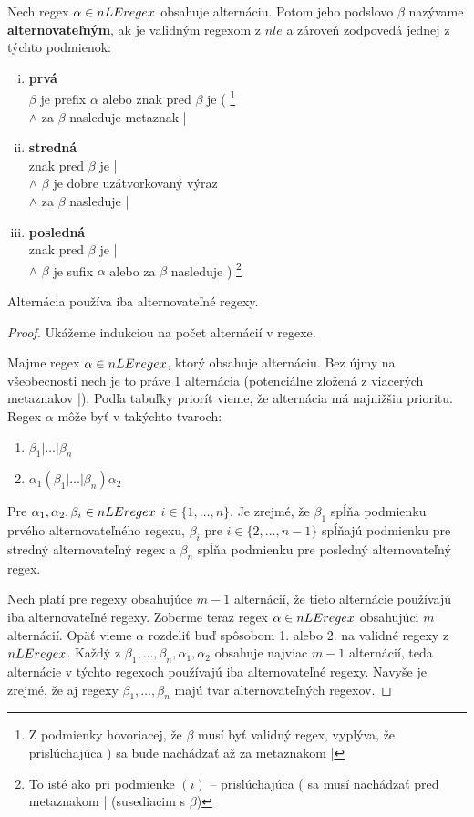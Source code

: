 \begin{df}
Nech regex $\alpha \in nLEregex$ obsahuje alternáciu. Potom jeho podslovo $\beta$ nazývame \textbf{alternovateľným}, ak je validným regexom z $nle$ a zároveň zodpovedá jednej z týchto podmienok:
\begin{enumerate}[(i)]
\item \textbf{prvá} \\ $\beta$ je prefix $\alpha$ alebo znak pred $\beta$ je ( \footnote{Z podmienky hovoriacej, že $\beta$ musí byť validný regex, vyplýva, že prislúchajúca ) sa bude nachádzať až za metaznakom |} 
\\ $\wedge$ za $\beta$ nasleduje metaznak |
\item \textbf{stredná} \\ znak pred $\beta$ je | \\ $\wedge$ $\beta$ je dobre uzátvorkovaný výraz \\ $\wedge$ za $\beta$ nasleduje |
\item \textbf{posledná} \\ znak pred $\beta$ je | \\
$\wedge$ $\beta$ je sufix $\alpha$ alebo za $\beta$ nasleduje ) \footnote{To isté ako pri podmienke $(i)$ -- prislúchajúca ( sa musí nachádzať pred metaznakom | (susediacim s $\beta$)}
\end{enumerate}
\end{df}

\begin{lema}
Alternácia používa iba alternovateľné regexy.
\end{lema}
\begin{proof}
Ukážeme indukciou na počet alternácií v regexe.

Majme regex $\alpha \in nLEregex$, ktorý obsahuje alternáciu. Bez újmy na všeobecnosti nech je to práve 1 alternácia (potenciálne zložená z viacerých metaznakov |). Podľa tabuľky priorít vieme, že alternácia má najnižšiu prioritu. Regex $\alpha$ môže byť v takýchto tvaroch:
\begin{enumerate}
\item $\beta_1|\dots|\beta_n$
\item $\alpha_1(\beta_1|\dots|\beta_n)\alpha_2$
\end{enumerate}
Pre $\alpha_1,\alpha_2,\beta_i\in nLEregex$ $i\in\lbrace 1,\dots,n\rbrace$. Je zrejmé, že $\beta_1$ spĺňa podmienku prvého alternovateľného regexu, $\beta_i$ pre $i\in\lbrace 2,\dots,n-1\rbrace$ spĺňajú podmienku pre stredný alternovateľný regex a $\beta_n$ spĺňa podmienku pre posledný alternovateľný regex.

Nech platí pre regexy obsahujúce $m-1$ alternácií, že tieto alternácie používajú iba alternovateľné regexy. Zoberme teraz regex $\alpha \in nLEregex$ obsahujúci $m$ alternácií. Opäť vieme $\alpha$ rozdeliť buď spôsobom 1. alebo 2. na validné regexy z $nLEregex$. Každý z $\beta_1,\dots,\beta_n,\alpha_1,\alpha_2$ obsahuje najviac $m-1$ alternácií, teda alternácie v týchto regexoch používajú iba alternovateľné regexy. Navyše je zrejmé, že aj regexy $\beta_1,\dots,\beta_n$ majú tvar alternovateľných regexov.
\end{proof}


